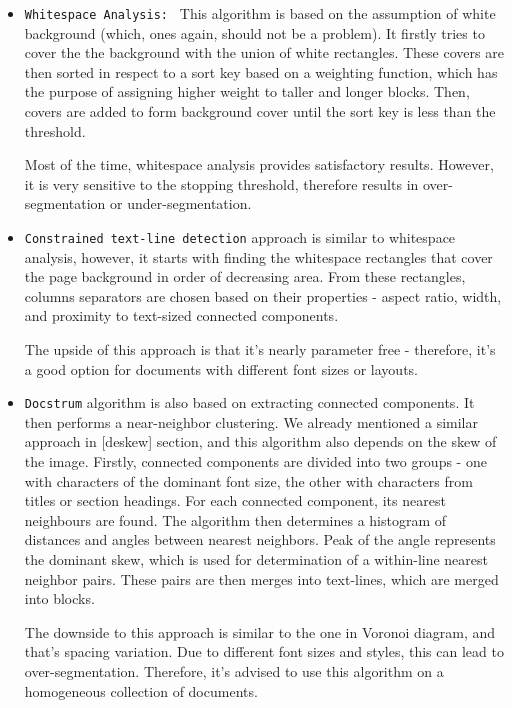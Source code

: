 \begin{itemize}
\item\texttt{Whitespace Analysis: } This algorithm is based on the assumption of white background (which, ones again, should not be a problem). It firstly tries to cover the the background with the union of white rectangles. These covers are then sorted in respect to a sort key based on a weighting function, which has the purpose of assigning higher weight to taller and longer blocks. Then, covers are added to form background cover until the sort key is less than the threshold.

Most of the time, whitespace analysis provides satisfactory results. However, it is very sensitive to the stopping threshold, therefore results in over-segmentation or under-segmentation.

\item\texttt{Constrained text-line detection} approach is similar to whitespace analysis, however, it starts with finding the whitespace rectangles that cover the page background in order of decreasing area. From these rectangles, columns separators are chosen based on their properties - aspect ratio, width, and proximity to text-sized connected components.

The upside of this approach is that it's nearly parameter free - therefore, it's a good option for documents with different font sizes or layouts.

\item\texttt{Docstrum} algorithm is also based on extracting connected components. It then performs a near-neighbor clustering. We already mentioned a similar approach in [deskew] section, and this algorithm also depends on the skew of the image. Firstly, connected components are divided into two groups - one with characters of the dominant font size, the other with characters from titles or section headings. For each connected component, its nearest neighbours are found. The algorithm then determines a histogram of distances and angles between nearest neighbors. Peak of the angle represents the dominant skew, which is used for determination of a within-line nearest neighbor pairs. These pairs are then merges into text-lines, which are merged into blocks.

The downside to this approach is similar to the one in Voronoi diagram, and that's spacing variation. Due to different font sizes and styles, this can lead to over-segmentation. Therefore, it's advised to use this algorithm on a homogeneous collection of documents.

\end{itemize}

